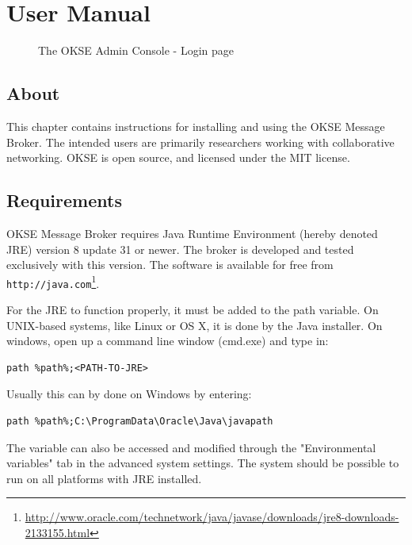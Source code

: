 \chapter{User Manual}
\label{appendix-user-manual}

\begin{center}
  \begin{figure}[ht!]
    \caption{The OKSE Admin Console - Login page} 
    \label{fig:OKSE Admin Console login page}
  \end{figure}
\end{center}

\section{About}

This chapter contains instructions for installing and using the OKSE Message Broker. The intended users are primarily researchers working with collaborative networking. OKSE is open source, and licensed under the MIT license.

\section{Requirements}

OKSE Message Broker requires Java Runtime Environment (hereby denoted JRE) version 8 update 31 or newer. The broker is developed and tested exclusively with this version. The software is available for free from \verb!http://java.com!\footnote{\url{http://www.oracle.com/technetwork/java/javase/downloads/jre8-downloads-2133155.html}}.

For the JRE to function properly, it must be added to the path variable. On UNIX-based systems, like Linux or OS X, it is done by the Java installer. On windows, open up a command line window (cmd.exe) and type in:
\begin{verbatim}
path %path%;<PATH-TO-JRE>
\end{verbatim}
Usually this can by done on Windows by entering:
\begin{verbatim}
path %path%;C:\ProgramData\Oracle\Java\javapath
\end{verbatim}
The variable can also be accessed and modified through the "Environmental variables" tab in the advanced system settings. The system should be possible to run on all platforms with JRE installed. 

